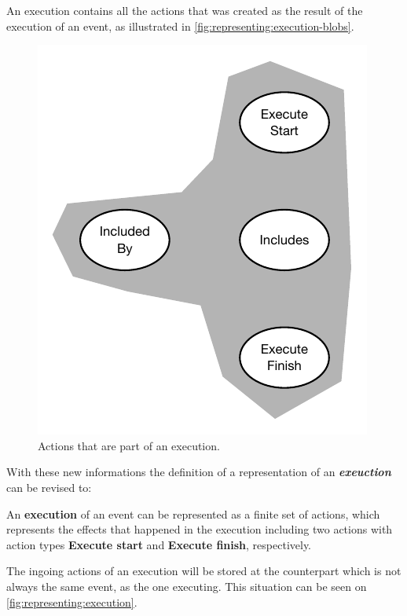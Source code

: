     
    \newpar An execution contains all the actions that was created as the result of the execution of an event, as illustrated in \autoref{fig:representing:execution-blobs}.
    
    \begin{figure}[H]
		\centering
		\includegraphics[height=0.35\textheight]{3local/images/execution-blobs.pdf}
		\caption{Actions that are part of an execution.}
		\label{fig:representing:execution-blobs}
	\end{figure}
    
	\noindent With these new informations the definition of a representation of an \textbf{\textit{exeuction}} can be revised to:
	
	\begin{definition}
		An \textbf{execution} of an event can be represented as a finite set of actions, which represents the effects that happened in the execution including two actions with action types \textbf{Execute start} and \textbf{Execute finish}, respectively.
		\label{def:execution}
	\end{definition}
	
    \noindent The ingoing actions of an execution will be stored at the counterpart which is not always the same event, as the one executing. This situation can be seen on \autoref{fig:representing:execution}.
    
